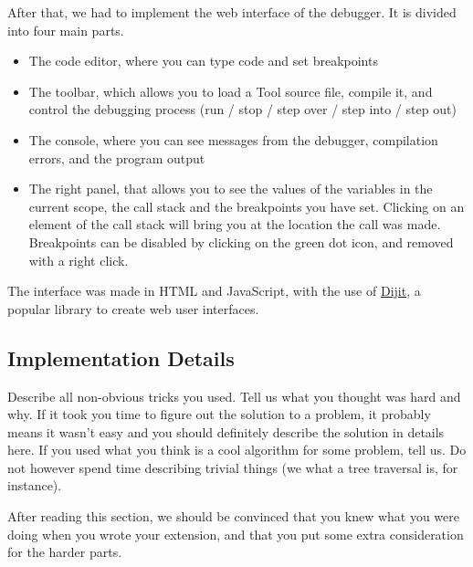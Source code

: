 After that, we had to implement the web interface of the debugger. It is divided into four main parts.

\begin{itemize}
\item The code editor, where you can type code and set breakpoints
\item The toolbar, which allows you to load a Tool source file, compile it, and control the debugging process (run / stop / step over / step into / step out)
\item The console, where you can see messages from the debugger, compilation errors, and the program output
\item The right panel, that allows you to see the values of the variables in the current scope, the call stack and the breakpoints you have set. Clicking on an element of the call stack will bring you at the location the call was made. Breakpoints can be disabled by clicking on the green dot icon, and removed with a right click.
\end{itemize}

The interface was made in HTML and JavaScript, with the use of \href{http://dojotoolkit.org/reference-guide/1.10/dijit/}{Dijit}, a popular library to create web user interfaces.

\subsection{Implementation Details}
Describe all non-obvious tricks you used. Tell us what you thought was hard and
why. If it took you time to figure out the solution to a problem, it probably
means it wasn't easy and you should definitely describe the solution in details
here. If you used what you think is a cool algorithm for some problem, tell us.
Do not however spend time describing trivial things (we what a tree traversal
is, for instance). 

After reading this section, we should be convinced that you knew what you were
doing when you wrote your extension, and that you put some extra consideration
for the harder parts.
